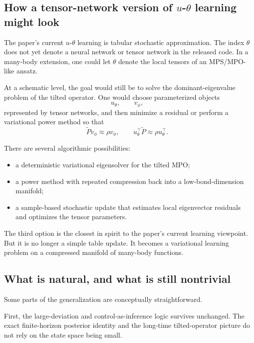 \documentclass[11pt]{article}
\begin{document}
\subsection*{How a tensor-network version of \(u\)-\(\theta\) learning might look}

The paper's current \(u\)-\(\theta\) learning is tabular stochastic approximation. The index
\(\theta\) does not yet denote a neural network or tensor network in the released code. In a
many-body extension, one could let \(\theta\) denote the local tensors of an MPS/MPO-like
ansatz.

At a schematic level, the goal would still be to solve the dominant-eigenvalue problem of the
tilted operator. One would choose parameterized objects
\begin{equation}
    u_\theta,\qquad v_\phi,
\end{equation}
represented by tensor networks, and then minimize a residual or perform a variational power
method so that
\begin{equation}
    \widetilde P v_\phi \approx \rho v_\phi,
    \qquad
    u_\theta^\top \widetilde P \approx \rho u_\theta^\top.
\end{equation}

There are several algorithmic possibilities:
\begin{itemize}
    \item a deterministic variational eigensolver for the tilted MPO;
    \item a power method with repeated compression back into a low-bond-dimension manifold;
    \item a sample-based stochastic update that estimates local eigenvector residuals and
    optimizes the tensor parameters.
\end{itemize}

The third option is the closest in spirit to the paper's current learning viewpoint. But it is
no longer a simple table update. It becomes a variational learning problem on a compressed
manifold of many-body functions.

\subsection*{What is natural, and what is still nontrivial}

Some parts of the generalization are conceptually straightforward.

First, the large-deviation and control-as-inference logic survives unchanged. The exact
finite-horizon posterior identity and the long-time tilted-operator picture do not rely on the
state space being small.
\end{document}
